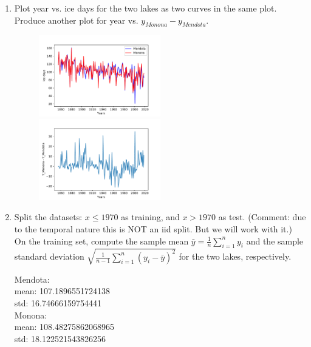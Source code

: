 \documentclass[a4paper]{article}
\theoremstyle{definition}
\newenvironment{soln}{
    \leavevmode\color{blue}\ignorespaces
}{}
\begin{document}
\begin{enumerate}
\item
Plot year vs. ice days for the two lakes as two curves in the same plot.
Produce another plot for year vs. $y_{Monona} - y_{Mendota}$.

\begin{soln}
	   \begin{figure}[H]
	        \centering
	        \includegraphics[width=0.5\textwidth]{q1_1.pdf}
	        \includegraphics[width=0.5\textwidth]{q1_2.pdf}
	        \captionsetup{labelformat=empty}
	        \caption{}
	        \label{fig:my_label}
	   \end{figure}

\end{soln}

\item
Split the datasets: $x\le 1970$ as training, and $x>1970$ as test.
(Comment: due to the temporal nature this is NOT an iid split.  But we will work with it.)
On the training set, compute the sample mean $\bar y=\frac{1}{n}\sum_{i=1}^n y_i$ and the sample standard deviation $\sqrt{\frac{1}{n-1}\sum_{i=1}^n (y_i-\bar y)^2}$ for the two lakes, respectively.

\begin{soln}
Mendota:\\
  mean:  107.1896551724138\\
  std:  16.74666159754441\\
Monona:\\
  mean:  108.48275862068965\\
  std:  18.122521543826256\\
\end{soln}


\end{enumerate}
\end{document}
